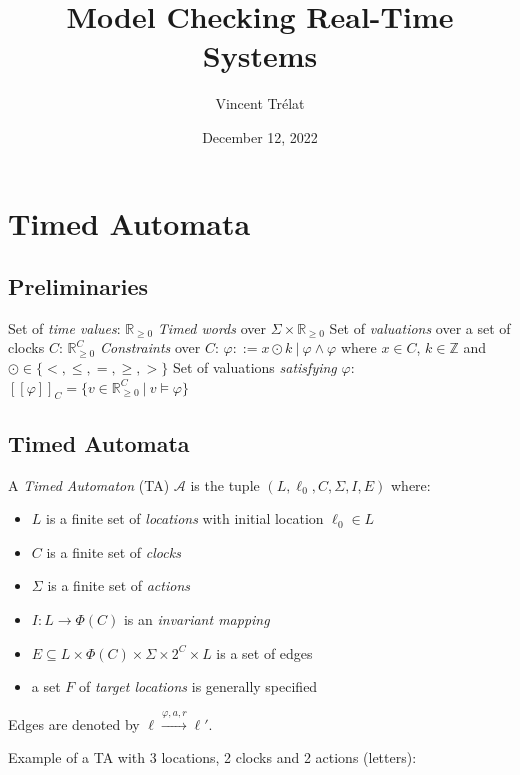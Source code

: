 \documentclass{beamer}
\title[Model Checking Real-Time Systems]{Model Checking Real-Time Systems}
\date{December 12, 2022}
\author[V. Trélat]{Vincent Trélat}
\institute[TUM]{Technical University of Munich}
\theoremstyle{definition}
\begin{document}
\begin{frame}
\titlepage
\end{frame}

\begin{frame}
\tableofcontents
\end{frame}

\section{Timed Automata}
\subsection{Preliminaries}

\begin{frame}
  Set of \emph{time values}: $\mathbb{R}_{\geq 0}$
  \vfill
  \emph{Timed words} over $\Sigma \times \mathbb{R}_{\geq 0}$
  \vfill
  Set of \emph{valuations} over a set of clocks $C$: $\mathbb{R}_{\geq 0}^C$
  \vfill
  \emph{Constraints} over $C$: $\varphi ::= x \odot k\ |\ \varphi \land \varphi$ where $x \in C$, $k \in \mathbb{Z}$ and $\odot \in \{<, \leq, =, \geq, >\}$
  \vfill
  Set of valuations \emph{satisfying} $\varphi$: $[\![\varphi]\!]_C = \{v \in \mathbb{R}_{\geq 0}^C\ |\ v \models \varphi\}$
\end{frame}


\subsection{Timed Automata}

\begin{frame}
  \begin{definition}
    A \emph{Timed Automaton} (TA) $\mathcal{A}$ is the tuple $(L, \ell_0, C, \Sigma, I, E)$ where:
    \begin{itemize}
      \item $L$ is a finite set of \emph{locations} with initial location $\ell_0 \in L$
      \item $C$ is a finite set of \emph{clocks}
      \item $\Sigma$ is a finite set of \emph{actions}
      \item $I \colon L \to \varPhi(C)$ is an \emph{invariant mapping}
      \item $E \subseteq L \times \varPhi(C) \times \Sigma \times 2^{C} \times L$ is a set of edges
      \item a set $F$ of \emph{target locations} is generally specified
    \end{itemize}
  \end{definition}
  \vfill
  Edges are denoted by $\ell \xrightarrow{\varphi, a, r} \ell'$.
\end{frame}
\begin{frame}
  Example of a TA with 3 locations, 2 clocks and 2 actions (letters):
\end{frame}
\end{document}
